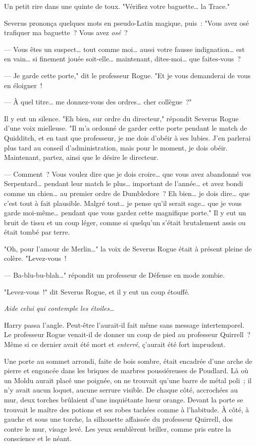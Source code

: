 Un petit rire dans une quinte de toux. "Vérifiez votre baguette… la Trace."

Severus prononça quelques mots en pseudo-Latin magique, puis~: "Vous avez osé trafiquer ma baguette~? Vous avez \emph{osé}~?

--- Vous êtes un suspect… tout comme moi… aussi votre fausse indignation… est en vain… si finement jouée soit-elle… maintenant, dites-moi… que faites-vous~?

--- Je garde cette porte," dit le professeur Rogue. "Et je vous demanderai de vous en éloigner~!

--- À quel titre… me donnez-vous des ordres… cher collègue~?"

Il y eut un silence. "Eh bien, sur ordre du directeur," répondit Severus Rogue d'une voix mielleuse. "Il m'a ordonné de garder cette porte pendant le match de Quidditch, et en tant que professeur, je me dois d'obéir à ses lubies. J'en parlerai plus tard au conseil d'administration, mais pour le moment, je dois obéir. Maintenant, partez, ainsi que le désire le directeur.

--- Comment~? Vous voulez dire que je dois croire… que vous avez abandonné vos Serpentard… pendant leur match le plus… important de l'année… et avez bondi comme un chien… au premier ordre de Dumbledore~? Eh bien… je dois dire… que c'est tout à fait plausible. Malgré tout… je pense qu'il serait sage… que je vous garde moi-même… pendant que vous gardez cette magnifique porte." Il y eut un bruit de tissu et un coup léger, comme si quelqu'un s'était brutalement assis ou était tombé par terre.

"Oh, pour l'amour de Merlin…" la voix de Severus Rogue était à présent pleine de colère. "Levez-vous~!

--- Ba-blu-bu-blah…" répondit un professeur de Défense en mode zombie.

"Levez-vous~!" dit Severus Rogue, et il y eut un coup étouffé.

\emph{Aide celui qui contemple les étoiles…}

Harry passa l'angle. Peut-être l'aurait-il fait même sans message intertemporel. Le professeur Rogue venait-il de donner un coup de pied au professeur Quirrell~? Même si ce dernier avait été mort et \emph{enterré}, ç'aurait été fort imprudent.

Une porte au sommet arrondi, faite de bois sombre, était encadrée d'une arche de pierre et engoncée dans les briques de marbres poussiéreuses de Poudlard. Là où un Moldu aurait placé une poignée, on ne trouvait qu'une barre de métal poli~; il n'y avait aucun loquet, aucune serrure visible. De chaque côté, accrochées au mur, deux torches brûlaient d'une inquiétante lueur orange. Devant la porte se trouvait le maître des potions et ses robes tachées comme à l'habitude. À côté, à gauche et sous une torche, la silhouette affaissée du professeur Quirrell, dos contre le mur, visage levé. Les yeux semblèrent briller, comme pris entre la conscience et le néant.

